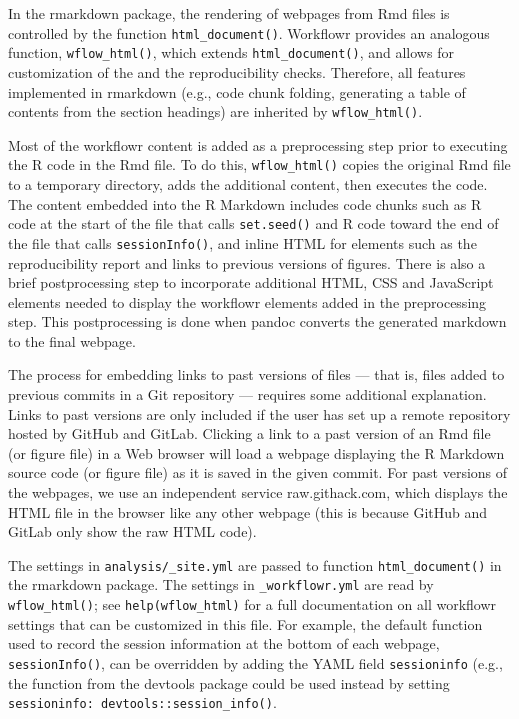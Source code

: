 \documentclass[9pt,a4paper]{extarticle}
\begin{document}
In the rmarkdown package, the rendering of webpages from Rmd files is
controlled by the function \texttt{html\_document()}. Workflowr provides an
analogous function, \texttt{wflow\_html()}, which extends \texttt{html\_document()}, and
allows for customization of the and the reproducibility checks.
Therefore, all features implemented in rmarkdown (e.g., code chunk
folding, generating a table of contents from the section headings) are
inherited by \texttt{wflow\_html()}.

Most of the workflowr content is added as a preprocessing step prior to
executing the R code in the Rmd file. To do this, \texttt{wflow\_html()} copies
the original Rmd file to a temporary directory, adds the additional
content, then executes the code. The content embedded into the R
Markdown includes code chunks such as R code at the start of the file
that calls \texttt{set.seed()} and R code toward the end of the file that calls
\texttt{sessionInfo()}, and inline HTML for elements such as the reproducibility
report and links to previous versions of figures. There is also a brief
postprocessing step to incorporate additional HTML, CSS and JavaScript
elements needed to display the workflowr elements added in the
preprocessing step. This postprocessing is done when pandoc converts the
generated markdown to the final webpage.

The process for embedding links to past versions of files --- that is,
files added to previous commits in a Git repository --- requires some
additional explanation. Links to past versions are only included if the
user has set up a remote repository hosted by GitHub and GitLab.
Clicking a link to a past version of an Rmd file (or figure file) in a
Web browser will load a webpage displaying the R Markdown source code
(or figure file) as it is saved in the given commit. For past versions
of the webpages, we use an independent service raw.githack.com, which
displays the HTML file in the browser like any other webpage (this is
because GitHub and GitLab only show the raw HTML code).

The settings in \verb|analysis/_site.yml| are passed to function
\texttt{html\_document()} in the rmarkdown package. The settings in
\verb|_workflowr.yml| are read by \texttt{wflow\_html()}; see
\texttt{help(wflow\_html)} for a full documentation on all workflowr
settings that can be customized in this file. For example, the default
function used to record the session information at the bottom of each
webpage, \texttt{sessionInfo()}, can be overridden by adding the YAML field
\verb|sessioninfo| (e.g., the function from the devtools package could
be used instead by setting \verb|sessioninfo: devtools::session_info()|.
\end{document}
